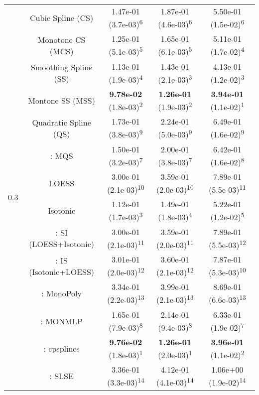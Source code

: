\begin{tabular}{ccccc}
\midrule
\multirow{14}{*}{0.3}&Cubic Spline (CS)& 1.47e-01 (3.7e-03)\textsuperscript{6}& 1.87e-01 (4.6e-03)\textsuperscript{6}& 5.50e-01 (1.5e-02)\textsuperscript{6}\tabularnewline
&Monotone CS (MCS)& 1.25e-01 (5.1e-03)\textsuperscript{5}& 1.65e-01 (6.1e-03)\textsuperscript{5}& 5.11e-01 (1.7e-02)\textsuperscript{4}\tabularnewline
&Smoothing Spline (SS)& 1.13e-01 (1.9e-03)\textsuperscript{4}& 1.43e-01 (2.1e-03)\textsuperscript{3}& 4.13e-01 (1.2e-02)\textsuperscript{3}\tabularnewline
&Montone SS (MSS)& \textbf{9.78e-02} (1.8e-03)\textsuperscript{2}& \textbf{1.26e-01} (1.9e-03)\textsuperscript{2}& \textbf{3.94e-01} (1.1e-02)\textsuperscript{1}\tabularnewline
&Quadratic Spline (QS)& 1.73e-01 (3.8e-03)\textsuperscript{9}& 2.24e-01 (5.0e-03)\textsuperscript{9}& 6.49e-01 (1.6e-02)\textsuperscript{9}\tabularnewline
&\textcite{heMonotoneBsplineSmoothing1998}: MQS& 1.50e-01 (3.2e-03)\textsuperscript{7}& 2.00e-01 (3.8e-03)\textsuperscript{7}& 6.42e-01 (1.6e-02)\textsuperscript{8}\tabularnewline
&LOESS& 3.00e-01 (2.1e-03)\textsuperscript{10}& 3.59e-01 (2.0e-03)\textsuperscript{10}& 7.89e-01 (5.5e-03)\textsuperscript{11}\tabularnewline
&Isotonic& 1.12e-01 (1.7e-03)\textsuperscript{3}& 1.49e-01 (1.8e-03)\textsuperscript{4}& 5.22e-01 (1.2e-02)\textsuperscript{5}\tabularnewline
&\textcite{mammenEstimatingSmoothMonotone1991}: SI (LOESS+Isotonic)& 3.00e-01 (2.1e-03)\textsuperscript{11}& 3.59e-01 (2.0e-03)\textsuperscript{11}& 7.89e-01 (5.5e-03)\textsuperscript{12}\tabularnewline
&\textcite{mammenEstimatingSmoothMonotone1991}: IS (Isotonic+LOESS)& 3.01e-01 (2.0e-03)\textsuperscript{12}& 3.60e-01 (2.1e-03)\textsuperscript{12}& 7.87e-01 (5.3e-03)\textsuperscript{10}\tabularnewline
&\textcite{murrayFastFlexibleMethods2016a}: MonoPoly& 3.34e-01 (2.2e-03)\textsuperscript{13}& 3.99e-01 (2.1e-03)\textsuperscript{13}& 8.69e-01 (6.6e-03)\textsuperscript{13}\tabularnewline
&\textcite{cannonMonmlpMultilayerPerceptron2017}: MONMLP& 1.65e-01 (7.9e-03)\textsuperscript{8}& 2.14e-01 (9.4e-03)\textsuperscript{8}& 6.33e-01 (1.9e-02)\textsuperscript{7}\tabularnewline
&\textcite{navarro-garciaConstrainedSmoothingOutofrange2023}: cpsplines& \textbf{9.76e-02} (1.8e-03)\textsuperscript{1}& \textbf{1.26e-01} (2.0e-03)\textsuperscript{1}& \textbf{3.96e-01} (1.1e-02)\textsuperscript{2}\tabularnewline
&\textcite{groeneboomConfidenceIntervalsMonotone2023}: SLSE& 3.36e-01 (3.3e-03)\textsuperscript{14}& 4.12e-01 (4.1e-03)\textsuperscript{14}& 1.06e+00 (1.9e-02)\textsuperscript{14}\tabularnewline
\bottomrule
\end{tabular}
